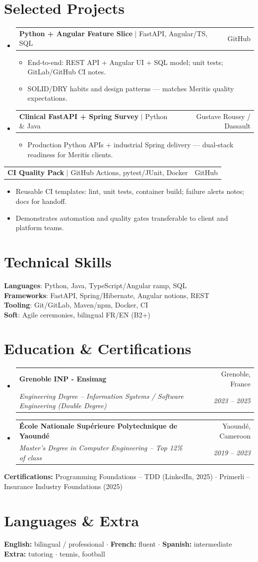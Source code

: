 \documentclass[letterpaper,10.5pt]{article}
\makeatletter
\newcommand{\resumeItem}[1]{\item\small{#1 \vspace{-1.5pt}}}
\newcommand{\resumeSubheading}[4]{\vspace{-1pt}\item\begin{tabular*}{0.97\textwidth}[t]{l@{\extracolsep{\fill}}r}\textbf{#1} & #2 \\\textit{\small#3} & \textit{\small #4} \\\end{tabular*}\vspace{-5pt}}
\newcommand{\resumeProjectHeading}[2]{\item\begin{tabular*}{0.97\textwidth}{l@{\extracolsep{\fill}}r}\small#1 & #2 \\\end{tabular*}\vspace{-5pt}}
\newcommand{\resumeSubHeadingListStart}{\begin{itemize}[leftmargin=0.15in, label={}]}
\newcommand{\resumeSubHeadingListEnd}{\end{itemize}}
\newcommand{\resumeItemListStart}{\begin{itemize}[leftmargin=0.18in]}
\newcommand{\resumeItemListEnd}{\end{itemize}\vspace{-3pt}}
\makeatother
\begin{document}
\section{Selected Projects}
\resumeSubHeadingListStart
  \resumeProjectHeading{\textbf{Python + Angular Feature Slice} $|$ FastAPI, Angular/TS, SQL}{GitHub}
    \resumeItemListStart
      \resumeItem{End-to-end: REST API + Angular UI + SQL model; unit tests; GitLab/GitHub CI notes.}
      \resumeItem{SOLID/DRY habits and design patterns --- matches Meritis quality expectations.}
    \resumeItemListEnd
  \resumeProjectHeading{\textbf{Clinical FastAPI + Spring Survey} $|$ Python \& Java}{Gustave Roussy / Dassault}
    \resumeItemListStart
      \resumeItem{Production Python APIs + industrial Spring delivery --- dual-stack readiness for Meritis clients.}
    \resumeItemListEnd
\resumeSubHeadingListEnd

  \resumeProjectHeading{\textbf{CI Quality Pack} $|$ GitHub Actions, pytest/JUnit, Docker}{GitHub}
    \resumeItemListStart
      \resumeItem{Reusable CI templates: lint, unit tests, container build; failure alerts notes; docs for handoff.}
      \resumeItem{Demonstrates automation and quality gates transferable to client and platform teams.}
    \resumeItemListEnd
\section{Technical Skills}
\begin{itemize}[leftmargin=0.15in, label={}]\small{\item{\textbf{Languages}: Python, Java, TypeScript/Angular ramp, SQL \\ \textbf{Frameworks}: FastAPI, Spring/Hibernate, Angular notions, REST \\ \textbf{Tooling}: Git/GitLab, Maven/npm, Docker, CI \\ \textbf{Soft}: Agile ceremonies, bilingual FR/EN (B2+)}}\end{itemize}
\section{Education \& Certifications}
\resumeSubHeadingListStart
  \resumeSubheading{Grenoble INP - Ensimag}{Grenoble, France}{Engineering Degree -- Information Systems / Software Engineering (Double Degree)}{2023 -- 2025}
  \resumeSubheading{\'Ecole Nationale Sup\'erieure Polytechnique de Yaound\'e}{Yaound\'e, Cameroon}{Master's Degree in Computer Engineering -- Top 12\% of class}{2019 -- 2023}
\resumeSubHeadingListEnd
\small{\textbf{Certifications:} Programming Foundations -- TDD (LinkedIn, 2025) $\cdot$ Primerli -- Insurance Industry Foundations (2025)}
\section{Languages \& Extra}
\small{\textbf{English:} bilingual / professional $\cdot$ \textbf{French:} fluent $\cdot$ \textbf{Spanish:} intermediate \\ \textbf{Extra:} tutoring $\cdot$ tennis, football}
\end{document}
